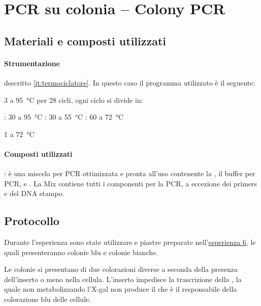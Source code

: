 \section{PCR su colonia -- \foreignlanguage{english}{Colony PCR}}

\subsection{Materiali e composti utilizzati}
\paragraph{Strumentazione}
\begin{itemize}
	\itemb[Termociclatore:] descritto \autoref{it:termociclatore}. In questo caso il programma utilizzato è il seguente:
	\begin{itemize}[squareItem]
		 \qty{3}{\min} a \qty{95}{\celsius}
		\itemb[Amplificazione] per 28 cicli, ogni ciclo si divide in:
		\begin{itemize}[squareItem]
			\itemb[Denaturazione]: \qty{30}{\sec} a \qty{95}{\celsius}
			\itemb[Ibridazione]: \qty{30}{\sec} a \qty{55}{\celsius}
			\itemb[Estensione]: \qty{60}{\sec} a \qty{72}{\celsius}
		\end{itemize}
		 \qty{1}{\min} a \qty{72}{\celsius}
	\end{itemize}
\end{itemize}

\paragraph{Composti utilizzati}
\begin{itemize}
	: è una miscela per PCR ottimizzata e pronta all'uso contenente la , il buffer per PCR,  e .
	La Mix contiene tutti i componenti per la PCR, a eccezione dei primers e del DNA stampo.
\end{itemize}


\subsection{Protocollo}
\begin{Note}
	Durante l'esperienza sono state utilizzare e piastre preparate nell'\hyperref[sec:6]{esperienza 6}, le quali presenteranno colonie blu e colonie bianche.

	Le colonie si presentano di due colorazioni diverse a seconda della presenza dell'inserto o meno nella cellula. L'inserto impedisce la trascrizione della , la quale non metabolizzando l’\gls{X-gal} non produce il  che è il responsabile della colorazione blu delle cellule.
\end{Note}

